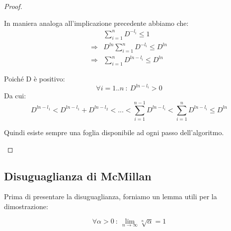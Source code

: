 \begin{teorema}
\begin{proof}
\begin{description}
In maniera analoga all'implicazione precedente abbiamo che:
\[
 \begin{split}
  & \sum_{i = 1}^n D^{-l_i} \leq 1 \\
  \Rightarrow & D^{ln} \sum_{i = 1}^n D^{-l_i} \leq D^{ln} \\
  \Rightarrow & \sum_{i = 1}^n D^{ln-l_i} \leq D^{ln}  
 \end{split}
\]

Poiché D è positivo:
\[
\forall i=1..n \ : \ D^{ln-l_i} > 0
\]
Da cui:
\[
  D^{ln-l_1} < D^{ln-l_1} + D^{ln-l_2} < ... < \sum_{i = 1}^{n-1} D^{ln-l_i}  < \sum_{i = 1}^n D^{ln-l_i} \leq D^{ln}  
\]

Quindi esiste sempre una foglia disponibile ad ogni passo dell'algoritmo.
\end{description}
\end{proof}
\end{teorema}

\subsection{Disuguaglianza di McMillan}
Prima di presentare la disuguaglianza, forniamo un lemma utili per la dimostrazione:

\begin{lemma}
 \[
  \forall \alpha > 0 \ : \ \lim_{n \to \infty} \sqrt[n]{\alpha}=1
 \]
\label{lemmaMillan}
\end{lemma}


